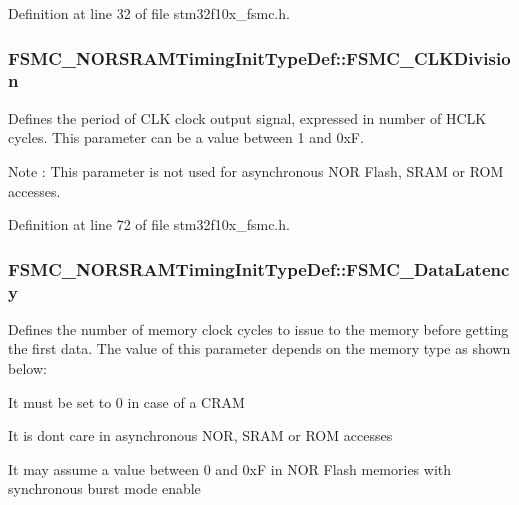 Definition at line 32 of file stm32f10x\+\_\+fsmc.\+h.

\subsubsection[{\texorpdfstring{F\+S\+M\+C\+\_\+\+C\+L\+K\+Division}{FSMC_CLKDivision}}]{ F\+S\+M\+C\+\_\+\+N\+O\+R\+S\+R\+A\+M\+Timing\+Init\+Type\+Def\+::\+F\+S\+M\+C\+\_\+\+C\+L\+K\+Division}\hypertarget{struct_f_s_m_c___n_o_r_s_r_a_m_timing_init_type_def_a251b439331b82eecea58aa3f8882ea15}{}\label{struct_f_s_m_c___n_o_r_s_r_a_m_timing_init_type_def_a251b439331b82eecea58aa3f8882ea15}
Defines the period of C\+LK clock output signal, expressed in number of H\+C\+LK cycles. This parameter can be a value between 1 and 0xF. \begin{DoxyNote}{Note}
\+: This parameter is not used for asynchronous N\+OR Flash, S\+R\+AM or R\+OM accesses. 
\end{DoxyNote}


Definition at line 72 of file stm32f10x\+\_\+fsmc.\+h.

\subsubsection[{\texorpdfstring{F\+S\+M\+C\+\_\+\+Data\+Latency}{FSMC_DataLatency}}]{ F\+S\+M\+C\+\_\+\+N\+O\+R\+S\+R\+A\+M\+Timing\+Init\+Type\+Def\+::\+F\+S\+M\+C\+\_\+\+Data\+Latency}\hypertarget{struct_f_s_m_c___n_o_r_s_r_a_m_timing_init_type_def_a85ad0cb267164d7ad9c5c662a455b5a6}{}\label{struct_f_s_m_c___n_o_r_s_r_a_m_timing_init_type_def_a85ad0cb267164d7ad9c5c662a455b5a6}
Defines the number of memory clock cycles to issue to the memory before getting the first data. The value of this parameter depends on the memory type as shown below\+:
\begin{DoxyItemize}
\item It must be set to 0 in case of a C\+R\+AM
\item It is don\textquotesingle{}t care in asynchronous N\+OR, S\+R\+AM or R\+OM accesses
\item It may assume a value between 0 and 0xF in N\+OR Flash memories with synchronous burst mode enable 
\end{DoxyItemize}

